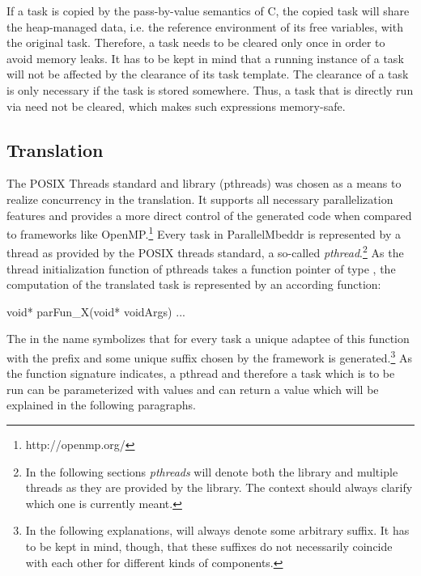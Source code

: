 If a task is copied by the pass-by-value semantics of C, the copied task will share the heap-managed data, i.e. the reference environment of its free variables, with the original task. Therefore, a task needs to be cleared only once in order to avoid memory leaks. It has to be kept in mind that a running instance of a task will not be affected by the clearance of its task template. The clearance of a task is only necessary if the task is stored somewhere. Thus, a task that is directly run via  need not be cleared, which makes such expressions memory-safe.

\subsection{Translation}
\label{tasksTranslation}
The POSIX Threads standard and library (pthreads) was chosen as a means to realize concurrency in the translation. It supports all necessary parallelization features and provides a more direct control of the generated code when compared to frameworks like OpenMP.\footnote{http://openmp.org/} Every task in ParallelMbeddr is represented by a thread as provided by the POSIX threads standard, a so-called \textit{pthread}.\footnote{In the following sections \textit{pthreads} will denote both the library and multiple threads as they are provided by the library. The context should always clarify which one is currently meant.} As the thread initialization function of pthreads takes a function pointer of type , the computation of the translated task is represented by an according function:
\begin{ccode}
void* parFun_X(void* voidArgs) {...}
\end{ccode}

The  in the name symbolizes that for every task a unique adaptee of this function with the prefix  and some unique suffix chosen by the framework is generated.\footnote{In the following explanations,  will always denote some arbitrary suffix. It has to be kept in mind, though, that these suffixes do not necessarily coincide with each other for different kinds of components.} As the function signature indicates, a pthread and therefore a task which is to be run can be parameterized with values and can return a value which will be explained in the following paragraphs.

